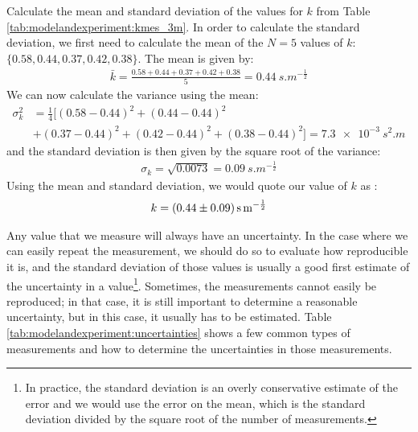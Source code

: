 \begin{example}{Calculate the mean and standard deviation of the values for $k$ from Table \ref{tab:modelandexperiment:kmes_3m}.}
\label{ex:modelandexperiment:stdcalc}
In order to calculate the standard deviation, we first need to calculate the mean of the $N=5$ values of $k$: $\{0.58, 0.44, 0.37, 0.42, 0.38 \}$. The mean is given by:
\begin{align*}
\bar k = \frac{0.58 + 0.44 + 0.37 + 0.42 + 0.38}{5}=\SI{0.44}{s.m^{-\frac{1}{2}}}
\end{align*}
We can now calculate the variance using the mean:
\begin{align*}
\sigma^2_k &= \frac{1}{4}[(0.58-0.44)^2+(0.44-0.44)^2\\
         &+(0.37-0.44)^2+(0.42-0.44)^2+(0.38-0.44)^2]=\SI{7.3e-3}{s^2.m}
\end{align*}
and the standard deviation is then given by the square root of the variance:
\begin{align*}
\sigma_k=\sqrt{0.0073}=\SI{0.09}{s.m^{-\frac{1}{2}}}
\end{align*}
Using the mean and standard deviation, we would quote our value of $k$ as :
\begin{align*}
k=\SI{0.44 \pm 0.09}{s.m^{-\frac{1}{2}}}
\end{align*}

\end{example}
Any value that we measure will always have an uncertainty. In the case where we can easily repeat the measurement, we should do so to evaluate how reproducible it is, and the standard deviation of those values is usually a good first estimate of the uncertainty in a value\footnote{In practice, the standard deviation is an overly conservative estimate of the error and we would use the error on the mean, which is the standard deviation divided by the square root of the number of measurements.}. Sometimes, the measurements cannot easily be reproduced; in that case, it is still important to determine a reasonable uncertainty, but in this case, it usually has to be estimated.  Table \ref{tab:modelandexperiment:uncertainties} shows a few common types of measurements and how to determine the uncertainties in those measurements. 

